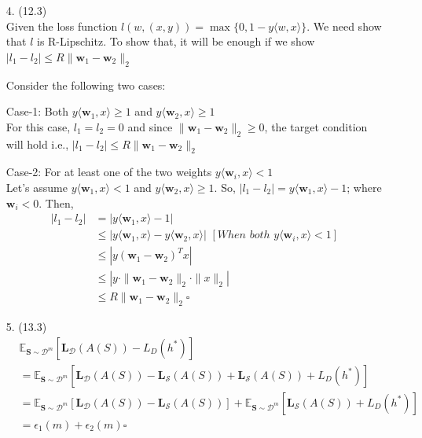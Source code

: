 \documentclass[12pt,letterpaper]{article}
\begin{document}
\begin{enumerate}
\item[4.] (12.3)\\
Given the loss function $l(w,(x, y)) =
\max\{0, 1 - y\langle w, x\rangle\}$. We need show that $l$ is R-Lipschitz. To show that, it will be enough if we show $|l_1 - l_2| \leq R\|\mathbf{w}_1 - \mathbf{w}_2\|_2 $

Consider the following two cases:

Case-1: Both $y\langle \mathbf{w}_1, x\rangle \ge 1$ and $y\langle \mathbf{w}_2, x\rangle \ge 1$ \\
For this case, $l_1 = l_2 = 0$ and since $\|\mathbf{w}_1 - \mathbf{w}_2\|_2 \ge 0$, the target condition will hold i.e.,
$|l_1 - l_2| \leq R\|\mathbf{w}_1 - \mathbf{w}_2\|_2 $

Case-2: For at least one of the two weights $y\langle \mathbf{w}_i, x\rangle < 1$ \\
Let's assume $y\langle \mathbf{w}_1, x\rangle < 1$ and $y\langle \mathbf{w}_2, x\rangle \ge 1$. So, $|l_1 - l_2| = y\langle \mathbf{w}_1, x\rangle - 1$; where $\mathbf{w}_i < 0$.
Then, 
\begin{align*}
    |l_1 - l_2| &= |y\langle \mathbf{w}_1, x\rangle - 1|\\
                &\leq |y\langle \mathbf{w}_1, x\rangle - y\langle \mathbf{w}_2, x\rangle| \hspace{4pt}[When \hspace{4pt}both \hspace{4pt}y\langle \mathbf{w}_i, x\rangle < 1]\\
                &\leq |y(\mathbf{w}_1 - \mathbf{w}_2)^Tx|\\
                &\leq |y\cdot \|\mathbf{w}_1 - \mathbf{w}_2\|_2\cdot\|x\|_2| \\
                &\leq R\|\mathbf{w}_1 - \mathbf{w}_2\|_2 \square
\end{align*}



\item[5.] (13.3)\\
\begin{align*}
    &\mathbb{E}_{\mathbf{S}\sim\mathcal{D}^m}[\mathbf{L}_\mathcal{D}(A(S)) - L_D(h^*)]\\
    &=\mathbb{E}_{\mathbf{S}\sim\mathcal{D}^m}[\mathbf{L}_\mathcal{D}(A(S)) - \mathbf{L}_\mathcal{S}(A(S)) + \mathbf{L}_\mathcal{S}(A(S)) + L_D(h^*)]\\
    &=\mathbb{E}_{\mathbf{S}\sim\mathcal{D}^m}[\mathbf{L}_\mathcal{D}(A(S)) - \mathbf{L}_\mathcal{S}(A(S))] + \mathbb{E}_{\mathbf{S}\sim\mathcal{D}^m}[\mathbf{L}_\mathcal{S}(A(S)) + L_D(h^*)]\\
    &=\epsilon_1(m) + \epsilon_2(m) \square
\end{align*}



\end{enumerate}
\end{document}
